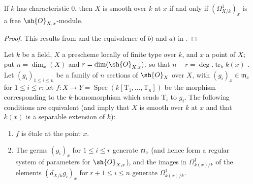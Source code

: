 \begin{corollary}[17.15.7]
\label{IV.17.15.7}
If $k$ has characteristic $0$, then $X$ is smooth over $k$ at $x$ if and only if $(\Omega^1_{X/k})_x$ is a free $\sh{O}_{X,x}$-module.
\end{corollary}

\begin{proof}
This results from  and the equivalence of $b)$ and $a)$ in .
\end{proof}

\begin{proposition}[17.15.8]
\label{IV.17.15.8}
Let $k$ be a field, $X$ a prescheme locally of finite type over $k$, and $x$ a point of $X$; put $n=\dim_x(X)$ and $r=\dim(\sh{O}_{X,x})$, so that $n-r=\deg.\operatorname{tr}_k k(x)$ .
Let $(g_i)_{1\leq i\leq n}$ be a family of $n$ sections of $\sh{O}_X$ over $X$, with $(g_i)_x\in\mathfrak m_x$ for $1\leq i\leq r$; let $f:X\to Y=\operatorname{Spec}(k[\mathrm{T}_1,\ldots,\mathrm{T}_n])$ be the morphism corresponding to the $k$-homomorphism which sends $\mathrm{T}_i$ to $g_i$.
The following conditions are equivalent (and imply that $X$ is smooth over $k$ at $x$ and that $k(x)$ is a separable extension of $k$):
\begin{enumerate}
  \item[a)] $f$ is \'etale at the point $x$.
  \item[b)] The germs $(g_i)_x$ for $1\leq i\leq r$ generate $\mathfrak m_x$ (and hence form a regular system of parameters for $\sh{O}_{X,x}$), and the images in $\Omega^1_{k(x)/k}$ of the elements $(d_{X/k}g_i)_x$ for $r+1\leq i\leq n$ generate $\Omega^1_{k(x)/k}$.
\end{enumerate}
\end{proposition}

